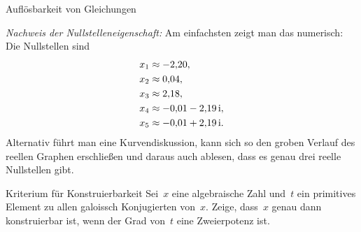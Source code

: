 \documentclass{algblatt}
\begin{document}
\begin{aufgabe}{Auflösbarkeit von Gleichungen}
\begin{loesungE}
\emph{Nachweis der Nullstelleneigenschaft:} Am einfachsten zeigt man das
numerisch: Die Nullstellen sind
\begin{align*}
  x_1 &\approx -2{,}20, \\
  x_2 &\approx 0{,}04, \\
  x_3 &\approx 2{,}18, \\
  x_4 &\approx -0{,}01 - 2{,}19\,\mathrm{i}, \\
  x_5 &\approx -0{,}01 + 2{,}19\,\mathrm{i}.
\end{align*}
Alternativ führt man eine Kurvendiskussion, kann sich so den groben Verlauf des
reellen Graphen erschließen und daraus auch ablesen, dass es genau drei reelle
Nullstellen gibt.
\end{loesungE}
\end{aufgabe}

\begin{aufgabe}{Kriterium für Konstruierbarkeit}
Sei~$x$ eine algebraische Zahl und~$t$ ein primitives Element zu allen galoissch
Konjugierten von~$x$. Zeige, dass~$x$ genau dann konstruierbar ist, wenn der
Grad von~$t$ eine Zweierpotenz ist.
\end{aufgabe}
\end{document}
